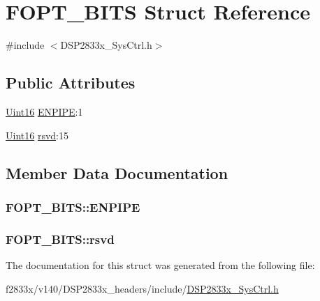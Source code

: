 \hypertarget{struct_f_o_p_t___b_i_t_s}{}\section{F\+O\+P\+T\+\_\+\+B\+I\+T\+S Struct Reference}
\label{struct_f_o_p_t___b_i_t_s}


{\ttfamily \#include $<$D\+S\+P2833x\+\_\+\+Sys\+Ctrl.\+h$>$}

\subsection*{Public Attributes}
\begin{DoxyCompactItemize}
\item 
\hyperlink{_d_s_p2833x___device_8h_a59a9f6be4562c327cbfb4f7e8e18f08b}{Uint16} \hyperlink{struct_f_o_p_t___b_i_t_s_a361e7496ee5059a373055063bcdaed20}{E\+N\+P\+I\+P\+E}\+:1
\item 
\hyperlink{_d_s_p2833x___device_8h_a59a9f6be4562c327cbfb4f7e8e18f08b}{Uint16} \hyperlink{struct_f_o_p_t___b_i_t_s_a39d2b2c0301e0cce10e1f0cb97591e63}{rsvd}\+:15
\end{DoxyCompactItemize}


\subsection{Member Data Documentation}
\hypertarget{struct_f_o_p_t___b_i_t_s_a361e7496ee5059a373055063bcdaed20}{}
\subsubsection[{E\+N\+P\+I\+P\+E}]{ F\+O\+P\+T\+\_\+\+B\+I\+T\+S\+::\+E\+N\+P\+I\+P\+E}\label{struct_f_o_p_t___b_i_t_s_a361e7496ee5059a373055063bcdaed20}
\hypertarget{struct_f_o_p_t___b_i_t_s_a39d2b2c0301e0cce10e1f0cb97591e63}{}
\subsubsection[{rsvd}]{ F\+O\+P\+T\+\_\+\+B\+I\+T\+S\+::rsvd}\label{struct_f_o_p_t___b_i_t_s_a39d2b2c0301e0cce10e1f0cb97591e63}


The documentation for this struct was generated from the following file\+:\begin{DoxyCompactItemize}
\item 
f2833x/v140/\+D\+S\+P2833x\+\_\+headers/include/\hyperlink{_d_s_p2833x___sys_ctrl_8h}{D\+S\+P2833x\+\_\+\+Sys\+Ctrl.\+h}\end{DoxyCompactItemize}
